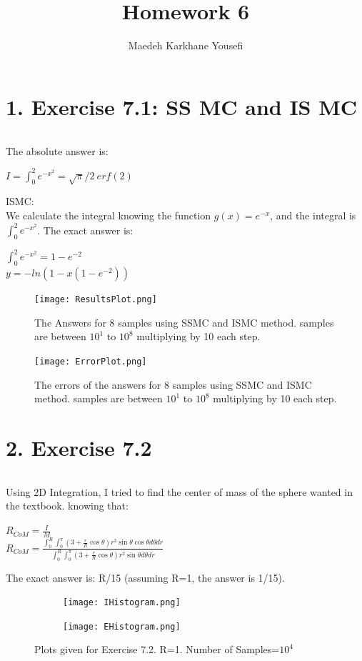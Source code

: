 \documentclass[12pt]{article}
\title{\textbf{Homework 6}}
\author{Maedeh Karkhane Yousefi}
\begin{document}
\maketitle
\part*{1. Exercise 7.1: SS MC and IS MC}
\paragraph*{}
The absolute answer is:
\begin{center}
$I= \int_{0}^2 e^{-x^2}= \sqrt{\pi}/2\ erf(2)$
\end{center}
ISMC:\\
We calculate the integral knowing the function $g(x)= e^{-x}$, and the integral is $\int_{0}^2 e^{-x^2}$. The exact answer is:
\begin{center}
$\int_{0}^2 e^{-x^2}= 1-e^{-2}$\\
$y=-ln(1-x(1-e^{-2}))$
\end{center}
\begin{figure}[H]
	\centering
	\texttt{[image: ResultsPlot.png]}
	\label{fig:mesh1}
	\caption{The Answers for 8 samples using SSMC and ISMC method. samples are between $10^{1}$ to $10^{8}$ multiplying by 10 each step.}
\end{figure}
\begin{figure}[H]
	\centering
	\texttt{[image: ErrorPlot.png]}
	\label{fig:mesh1}
	\caption{The errors of the answers for 8 samples using SSMC and ISMC method. samples are between $10^{1}$ to $10^{8}$ multiplying by 10 each step.}
\end{figure}
\part*{2. Exercise 7.2}
\paragraph*{}
Using 2D Integration, I tried to find the center of mass of the sphere wanted in the textbook. knowing that: 
\begin{center}
$R_{CoM} = \frac{I}{M}$\\
$ R_{CoM} = \frac{\int_0^R\int_0^\pi (3+\frac{r}{R}\cos{\theta})r^3\sin{\theta}\cos{\theta} d\theta dr}{\int_0^R\int_0^\pi (3+\frac{r}{R}\cos{\theta})r^2\sin{\theta} d\theta dr}$\\
\end{center}
The exact answer is: R/15 (assuming R=1, the answer is 1/15).
\begin{figure}[H]
	\centering
	\begin{subfigure}[t]{0.8\textwidth}
		\texttt{[image: IHistogram.png]}
		\label{fig:mesh1.1}
		\caption{}
	\end{subfigure}\par\bigskip 
	\begin{subfigure}[t]{0.8\textwidth}
		\texttt{[image: EHistogram.png]}
		\label{fig:mesh1.2}
		\caption{}
	\end{subfigure}
	\label{fig:mesh1}
	\caption{Plots given for Exercise 7.2. R=1. Number of Samples=$10^{4}$}
\end{figure}
\end{document}
